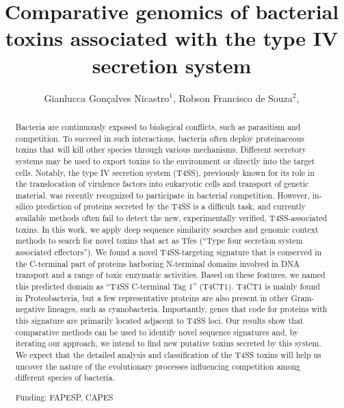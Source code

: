 \documentclass[twoside]{article}
\title{\vspace{-15mm}\fontsize{24pt}{10pt}\selectfont\textbf{ Comparative genomics of bacterial toxins associated with the type IV secretion system }} %
\author{ Gianlucca Gonçalves Nicastro$^{1}$, Robson Francisco de Souza$^{2}$, }
\affil{ 1 Instituto de Ciências Biomédicas

2 USP

 }
\date{}
\begin{document}
  
  
  \maketitle %
  
  
  \thispagestyle{fancy} %
  
  
  \begin{abstract}
  Bacteria are continuously exposed to biological conflicts, such as parasitism and competition. To succeed in such interactions, bacteria often deploy proteinaceous toxins that will kill other species through various mechanisms. Different secretory systems may be used to export toxins to the environment or directly into the target cells. Notably, the type IV secretion system (T4SS), previously known for its role in the translocation of virulence factors into eukaryotic cells and transport of genetic material, was recently recognized to participate in bacterial competition. However, in-silico prediction of proteins secreted by the T4SS is a difficult task, and currently available methods often fail to detect the new, experimentally verified, T4SS-associated toxins. In this work, we apply deep sequence similarity searches and genomic context methods to search for novel toxins that act as Tfes (“Type four secretion system associated effectors”). We found a novel T4SS-targeting signature that is conserved in the C-terminal part of proteins harboring N-terminal domains involved in DNA transport and a range of toxic enzymatic activities. Based on these features, we named this predicted domain as “T4SS C-terminal Tag 1” (T4CT1). T4CT1 is mainly found in Proteobacteria, but a few representative proteins are also present in other Gram-negative lineages, such as cyanobacteria. Importantly, genes that code for proteins with this signature are primarily located adjacent to T4SS loci. Our results show that comparative methods can be used to identify novel sequence signatures and, by iterating our approach, we intend to find new putative toxins secreted by this system. We expect that the detailed analysis and classification of the T4SS toxins will help us uncover the nature of the evolutionary processes influencing competition among different species of bacteria.
  
  Funding: FAPESP, CAPES \\ 
  \end{abstract}
  
\end{document}
